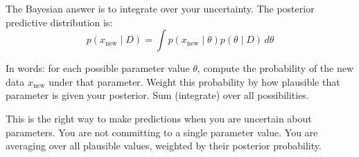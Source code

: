 The Bayesian answer is to integrate over your uncertainty. The posterior predictive distribution is:
\begin{equation}
p(x_{\text{new}} \mid D) = \int p(x_{\text{new}} \mid \theta) p(\theta \mid D) \, d\theta
\end{equation}

In words: for each possible parameter value $\theta$, compute the probability of the new data $x_{\text{new}}$ under that parameter. Weight this probability by how plausible that parameter is given your posterior. Sum (integrate) over all possibilities.

This is the right way to make predictions when you are uncertain about parameters. You are not committing to a single parameter value. You are averaging over all plausible values, weighted by their posterior probability.

\vspace{1.5em}

